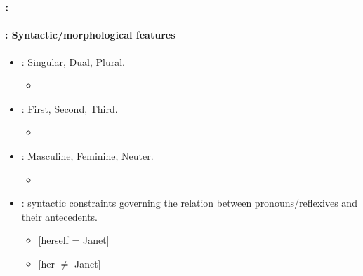 \documentclass[xcolor=table]{beamer}
\begin{document}
\begin{frame}
	\frametitle{\insertshortsubtitle: \insertsection}
	\framesubtitle{\insertsubsection: Syntactic/morphological features}
	
	
	\begin{itemize}
		\item {}: Singular, Dual, Plural.
		\begin{itemize}
			\item {}
		\end{itemize}
	
		\item {}: First, Second, Third.
		\begin{itemize}
			\item {}
		\end{itemize}
		
		\item {}: Masculine, Feminine, Neuter.
		\begin{itemize}
			\item {}
		\end{itemize}
		
		\item {}: syntactic constraints governing the relation between pronouns/reflexives and their antecedents.
		
		\begin{itemize}
			\item {} [herself = Janet]
			\item {} [her $\ne$ Janet]
		\end{itemize}
	
	\end{itemize}
	
\end{frame}
\end{document}
